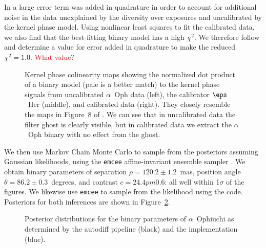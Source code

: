 \documentclass[modern]{aastex63}
\begin{document}
In \citet{martinache20} a large error term was added in quadrature in order to account for additional noise in the data unexplained by the diversity over exposures and uncalibrated by the kernel phase model. Using nonlinear least squares to fit the calibrated data, we also find that the best-fitting binary model has a high $\chi^2$. We therefore follow \citet{martinache20} and determine a value for error added in quadrature to make the reduced $\chi^2 = 1.0$. \textcolor{red}{What value?}

\begin{figure}
\caption{Kernel phase colinearity maps showing the normalized dot product of a binary model (pale is a better match) to the kernel phase signals from uncalibrated $\alpha$~Oph data (left), the calibrator $\eps$~Her (middle), and calibrated data (right). They closely resemble the maps in Figure~8 of \citet{martinache20}. We can see that in uncalibrated data the filter ghost is clearly visible, but in calibrated data we extract the $\alpha$~Oph binary with no effect from the ghost. \label{colinearity}}
\end{figure}

We then use Markov Chain Monte Carlo \citep{metropolis53} to sample from the posteriors assuming Gaussian likelihoods, using the \texttt{emcee} affine-invariant ensemble sampler \citep{emcee}. We obtain binary parameters of separation $\rho = 120.2 \pm 1.2$~mas, position angle $\theta = 86.2 \pm 0.3$~degrees, and contrast $c = 24.4 pm 0.6$: all well within 1$\sigma$ of the \citet{martinache20} figures. We likewise use \texttt{emcee} to sample from the likelihood using the \citet{martinache20} code. Posteriors for both inferences are shown in Figure~\ref{comparison_posterior}.

\begin{figure}
\caption{Posterior distributions for the binary parameters of $\alpha$~Ophiuchi as determined by the autodiff pipeline (black) and the \citet{martinache20} implementation (blue). \label{comparison_posterior}}
\end{figure}

\end{document}
